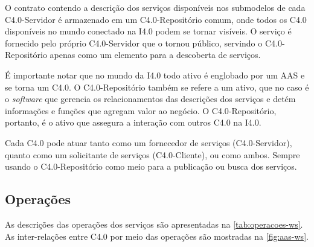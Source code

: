 O contrato contendo a descrição dos serviços disponíveis nos submodelos de cada C4.0-Servidor é armazenado em um C4.0-Repositório comum, onde todos os C4.0 disponíveis no mundo conectado na I4.0 podem se tornar visíveis. O serviço é fornecido pelo próprio C4.0-Servidor que o tornou público, servindo o C4.0-Repositório apenas como um elemento para a descoberta de serviços.

É importante notar que no mundo da I4.0 todo ativo é englobado por um AAS e se torna um C4.0. O C4.0-Repositório também se refere a um ativo, que no caso é o \textit{software} que gerencia os relacionamentos das descrições dos serviços e detém informações e funções que agregam valor ao negócio. O C4.0-Repositório, portanto, é o ativo que assegura a interação com outros C4.0 na I4.0.

Cada C4.0 pode atuar tanto como um fornecedor de serviços (C4.0-Servidor), quanto como um solicitante de serviços (C4.0-Cliente), ou como ambos. Sempre usando o C4.0-Repositório como meio para a publicação ou busca dos serviços.

\subsection{Operações}

As descrições das operações dos serviços são apresentadas na \autoref{tab:operacoes-ws}. As inter-relações entre C4.0 por meio das operações são mostradas na \autoref{fig:aas-ws}.

